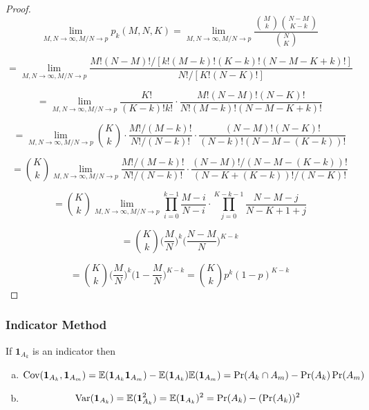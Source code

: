 \begin{proof}
\[
\lim_{M, N \to \infty, M/N \to p} p_k(M, N, K) = \lim_{M, N \to \infty, M/N \to p} \frac{\binom{M}{k} \binom{N-M}{K-k}}{\binom{N}{K}}
\]

\[
= \lim_{M, N \to \infty, M/N \to p} \frac{M!(N-M)!/[k!(M-k)!(K-k)!(N-M-K+k)!]}{N!/[K!(N-K)!]}
\]

\[
= \lim_{M, N \to \infty, M/N \to p} \frac{K!}{(K-k)!k!}\cdot \frac{M!(N-M)!(N-K)!}{N!(M-k)!(N-M-K+k)!}
\]



\[
= \lim_{M, N \to \infty, M/N \to p} \binom{K}{k}\cdot \frac{M!/ (M-k)!}{N!/(N-k)!} \cdot \frac{ (N-M)!(N-K)!}{(N-k)! (N-M-(K-k))!}
\]

\[
= \binom{K}{k} \lim_{M, N \to \infty, M/N \to p} \frac{M!/ (M-k)!}{N!/(N-k)!} \cdot \frac{ (N-M)!/  (N-M-(K-k))!}{(N-K+(K-k))!/(N-K)!}
\]

\[
= \binom{K}{k} \lim_{M, N \to \infty, M/N \to p}\prod_{i=0}^{k-1} \frac{M-i}{N-i} \cdot \prod_{j=0}^{K-k-1} \frac{N-M-j}{N-K+1+j}
\]


\[
= \binom{K}{k} \bigg(\frac{M}{N} \bigg)^k \bigg(\frac{N - M}{N} \bigg)^{K-k}
\]

\[
= \binom{K}{k} \bigg(\frac{M}{N} \bigg)^k \bigg(1 - \frac{M}{N} \bigg)^{K-k}=  \binom{K}{k}p^k(1-p)^{K-k} 
\]
\end{proof}


\subsubsection{Indicator Method}

\begin{proposition} If \(\boldsymbol{1}_{A_k}\) is an indicator then

\begin{enumerate}[(a)]

\item

\[
\Cov(\boldsymbol{1}_{A_k}, \boldsymbol{1}_{A_m}) = \E(\boldsymbol{1}_{A_k} \boldsymbol{1}_{A_m}) - \E(\boldsymbol{1}_{A_k}) \E(\boldsymbol{1}_{A_m}) = \Pr(A_k \cap A_m) - \Pr(A_k) \Pr(A_m)
\]

\item

\[
\Var(\boldsymbol{1}_{A_k} ) = \E(\boldsymbol{1}_{A_k} ^2) = \E(\boldsymbol{1}_{A_k} )^2 = \Pr(A_k) - (\Pr(A_k))^2
\]

\end{enumerate}
\end{proposition}

